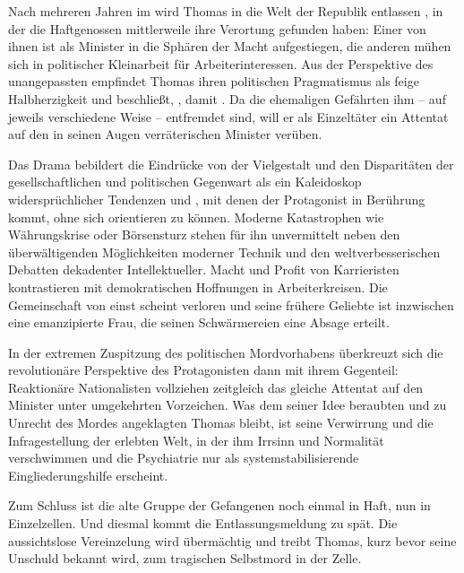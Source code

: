 Nach mehreren Jahren im \Cite{Irrenhaus} wird Thomas \Cite{geheilt} in die
Welt der Republik entlassen , in der die Haftgenossen
mittlerweile ihre Verortung gefunden haben: Einer von ihnen ist als Minister
in die Sphären der Macht aufgestiegen, die anderen mühen sich in politischer
Kleinarbeit für Arbeiterinteressen. Aus der Perspektive des unangepassten
 empfindet Thomas ihren politischen Pragmatismus als
feige Halbherzigkeit und beschließt, \Cite{ein Beispiel [zu] geben}, damit
\Cite{die Lahmen rennen} .  Da die ehemaligen Gefährten ihm
-- auf jeweils verschiedene Weise -- entfremdet sind, will er als Einzeltäter
ein Attentat auf den in seinen Augen verräterischen Minister verüben.

Das Drama bebildert die Eindrücke von der Vielgestalt und den Disparitäten der
gesellschaftlichen und politischen Gegenwart als ein Kaleidoskop
widersprüchlicher Tendenzen und , mit denen der Protagonist
in Berührung kommt, ohne sich orientieren zu können. Moderne Katastrophen wie
Währungskrise oder Börsensturz stehen für ihn unvermittelt neben den
überwältigenden Möglichkeiten moderner Technik und den weltverbesserischen
Debatten dekadenter Intellektueller. Macht und Profit von Karrieristen
kontrastieren mit demokratischen Hoffnungen in Arbeiterkreisen. Die
Gemeinschaft von einst scheint verloren und seine frühere Geliebte ist
inzwischen eine emanzipierte Frau, die seinen Schwärmereien eine Absage
erteilt. 

In der extremen Zuspitzung des
politischen Mordvorhabens überkreuzt sich die revolutionäre Perspektive des
Protagonisten dann mit ihrem Gegenteil: Reaktionäre Nationalisten vollziehen
zeitgleich das gleiche Attentat auf den Minister unter umgekehrten Vorzeichen.
Was dem seiner Idee beraubten und zu Unrecht des Mordes angeklagten Thomas
bleibt, ist seine Verwirrung und die Infragestellung der erlebten Welt, in der
ihm Irrsinn und Normalität verschwimmen und die Psychiatrie nur als
systemstabilisierende Eingliederungshilfe erscheint.

Zum Schluss ist die alte Gruppe der Gefangenen noch einmal in Haft, nun in
Einzelzellen. Und diesmal kommt die Entlassungsmeldung zu spät. Die
aussichtslose Vereinzelung wird übermächtig und treibt Thomas, kurz bevor
seine Unschuld bekannt wird, zum tragischen Selbstmord in der Zelle.

\medskip


